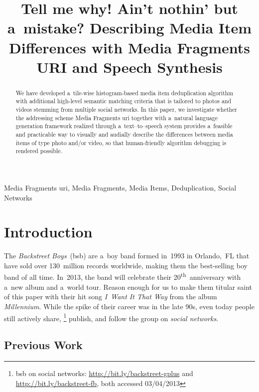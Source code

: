\documentclass{article}
\begin{document}
\sloppy

\newcommand{\ts}{\textsuperscript}

\title{Tell me why! Ain't nothin' but a~mistake? Describing Media Item Differences with Media Fragments URI and Speech Synthesis}
%
\address{}

\maketitle

%
\begin{abstract}
We have developed a~tile-wise histogram-based
media item deduplication algorithm
with additional high-level semantic matching criteria
that is tailored to photos and videos stemming from multiple social networks.
In this paper, we investigate whether the addressing scheme
Media Fragments {\sc uri} together with a~natural language generation framework realized through a~text--to--speech system
provides a~feasible and practicable way
to visually and audially describe the differences
between media items of type photo and/or video,
so that human-friendly algorithm debugging is rendered possible.
\end{abstract}
%
\begin{keywords}
Media Fragments {\sc uri}, Media Fragments, Media Items, Deduplication, Social Networks
\end{keywords}
%
\section{Introduction}
\label{sec:introduction}

The \emph{Backstreet Boys}~({\sc bsb}) are a~boy band
formed in~1993 in Orlando,~FL
that have sold over 130~million records worldwide,
making them the best-selling boy band of all time.
In~2013, the band will celebrate their 20\ts{th}~anniversary
with a~new album and a~world tour.
Reason enough for us to make them titular saint of this paper
with their hit song \emph{I~Want It That Way}
from the album \emph{Millennium}.
While the spike of their career was in the late 90s,
even today people still actively share,%
\footnote{{\sc bsb} on social networks: \url{http://bit.ly/backstreet-gplus}
and \url{http://bit.ly/backstreet-fb},
both accessed 03/04/2013}
publish, and follow the group on \emph{social networks}.

\subsection{Previous Work}
\label{sec:previous-work}
\end{document}
